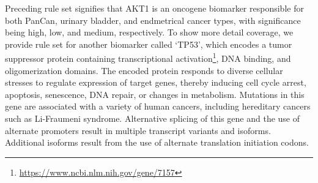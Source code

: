 \hspace*{3.5mm} Preceding rule set signifies that AKT1 is an oncogene biomarker responsible for both PanCan, urinary bladder, and endmetrical cancer types, with significance being high, low, and medium, respectively. To show more detail coverage, we provide rule set for another biomarker called `TP53', which encodes a tumor suppressor protein containing transcriptional activation\footnote{\url{https://www.ncbi.nlm.nih.gov/gene/7157}}, DNA binding, and oligomerization domains. The encoded protein responds to diverse cellular stresses to regulate expression of target genes, thereby inducing cell cycle arrest, apoptosis, senescence, DNA repair, or changes in metabolism. Mutations in this gene are associated with a variety of human cancers, including hereditary cancers such as Li-Fraumeni syndrome. Alternative splicing of this gene and the use of alternate promoters result in multiple transcript variants and isoforms. Additional isoforms result from the use of alternate translation initiation codons. 

